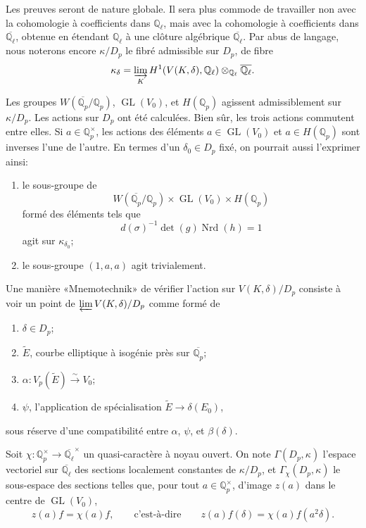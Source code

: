 \documentclass[11pt]{article}
\newcommand{\Qp}{\mathbb{Q}_{p}}
\newcommand{\Ql}{\mathbb{Q}_{\ell}}
\newcommand{\GL}{\operatorname{GL}}
\newcommand{\Nrd}{\operatorname{Nrd}}
\newcommand{\Lim}{\varinjlim}
\newcommand{\Prolim}{\varprojlim}
\newcommand{\wt}{\widetilde}
\begin{document}
Les preuves seront de nature globale. Il sera plus commode de travailler non avec la cohomologie à coefficients dans \(\Ql\), mais avec la cohomologie à coefficients dans \(\overline{\Ql}\), obtenue en étendant \(\Ql\) à une clôture algébrique \(\overline{\Ql}\). Par abus de langage, nous noterons encore \(\kappa/D_p\) le fibré admissible sur \(D_p\), de fibre
\[
\kappa_{\delta}=\Lim_K H^1(V(K,\delta),\Ql)\otimes_{\Ql}\overline{\Ql}.
\]

Les groupes \(W(\overline{\Qp}/\Qp)\), \(\GL(V_0)\), et \(H(\Qp)\) agissent admissiblement sur \(\kappa/D_p\). Les actions sur \(D_p\) ont été calculées. Bien sûr, les trois actions commutent entre elles. Si \(a\in\Qp^\times\), les actions des éléments \(a\in\GL(V_0)\) et \(a\in H(\Qp)\) sont inverses l'une de l'autre. En termes d'un \(\delta_0\in D_p\) fixé, on pourrait aussi l'exprimer ainsi:
\begin{enumerate}[label=(\alph*)]
\item le sous-groupe de
\[
W(\overline{\Qp}/\Qp)\times\GL(V_0)\times H(\Qp)
\]
formé des éléments tels que
\[
d(\sigma)^{-1}\det(g)\Nrd(h)=1
\]
agit sur \(\kappa_{\delta_0}\);
\item le sous-groupe \((1,a,a)\) agit trivialement.
\end{enumerate}

Une manière «Mnemotechnik» de vérifier l'action sur \(V(K,\delta)/D_p\) consiste à voir un point de \(\Prolim V(K,\delta)/D_p\) comme formé de
\begin{enumerate}[label=(\alph*)]
\item \(\delta\in D_p\);
\item \(\wt E\), courbe elliptique à isogénie près sur \(\overline{\Qp}\);
\item \(\alpha:V_p(\wt E)\xrightarrow{\sim}V_0\);
\item \(\psi\), l'application de spécialisation \(\wt E\to\delta(E_0)\),
\end{enumerate}
sous réserve d'une compatibilité entre \(\alpha\), \(\psi\), et \(\beta(\delta)\).

Soit \(\chi:\Qp^\times\to\overline{\Ql}^{\times}\) un quasi-caractère à noyau ouvert. On note \(\Gamma(D_p,\kappa)\) l'espace vectoriel sur \(\overline{\Ql}\) des sections localement constantes de \(\kappa/D_p\), et \(\Gamma_{\chi}(D_p,\kappa)\) le sous-espace des sections telles que, pour tout \(a\in\Qp^\times\), d'image \(z(a)\) dans le centre de \(\GL(V_0)\),
\[
z(a)f=\chi(a)f,\qquad\text{c'est-à-dire}\qquad
z(a)f(\delta)=\chi(a)f(a^2\delta).
\]
\end{document}
